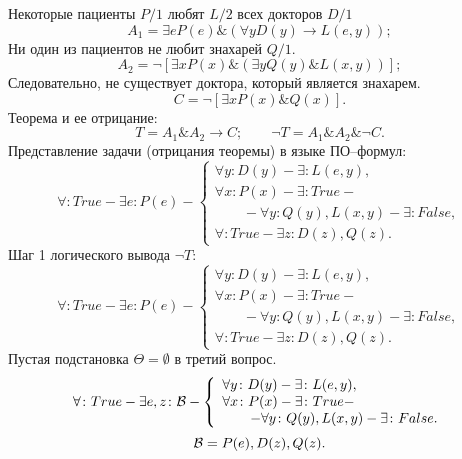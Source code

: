 \documentclass[12pt]{article}
\begin{document}
\Large{}
\noindent{}Некоторые пациенты $P/1$ любят $L/2$ всех докторов $D/1$\\
$$
A_1=\exists{} e P(e)\&{}(\forall{} y D(y)\rightarrow{}L(e,y));
$$
Ни один из пациентов не любит знахарей $Q/1$.\\
$$
A_2=\neg{}[\exists{} x P(x)\&{}(\exists{} y Q(y)\&{}L(x,y))];
$$
Следовательно, не существует доктора, который является знахарем.
$$
C=\neg{}[\exists{} x P(x)\&{}Q(x)].
$$
Теорема и ее отрицание:
$$
T=A_1\&{}A_2\rightarrow{}C;\qquad{}\neg{}T=A_1\&{}A_2\&\neg{}C.
$$
\newpage{}
\noindent{}Представление задачи (отрицания теоремы) в языке ПО--формул:
$$
\forall\colon True - \exists e\colon P(e) - \left\{
\begin{array}{lcl}
 \forall y \colon D(y) - \exists{}\colon{} L(e,y), \\
 \forall x \colon P(x) - \exists\colon{} True - \\
 \hspace{2em} - \forall{} y \colon{} Q(y),L(x,y) - \exists{}\colon{} False, \\
 \forall \colon{} True - \exists{} z\colon{} D(z),Q(z).
\end{array}
\right.
$$
\newpage{}
\noindent{}Шаг 1 логического вывода $\neg{}T$:
$$
\forall\colon True - \exists e\colon P(e) - \left\{
\begin{array}{lcl}
 \forall y \colon D(y) - \exists{}\colon{} L(e,y), \\
 \forall x \colon P(x) - \exists\colon{} True - \\
 \hspace{2em} - \forall{} y \colon{} Q(y),L(x,y) - \exists{}\colon{} False, \\
 \forall \colon{} True - \exists{} z\colon{} D(z),Q(z).
\end{array}
\right.
$$
Пустая подстановка $\Theta=\emptyset{}$ в третий вопрос.
$$
\forall\colon True - \exists e, z\colon {\cal{} B}- \left\{
\begin{array}{lcl}
 \forall y \colon D(y) - \exists{}\colon{} L(e,y), \\
 \forall x \colon P(x) - \exists\colon{} True - \\
 \hspace{2em} - \forall{} y \colon{} Q(y),L(x,y) - \exists{}\colon{} False.
\end{array}
\right.
$$
$$
{\cal{} B} = P(e),D(z),Q(z).
$$
\end{document}
